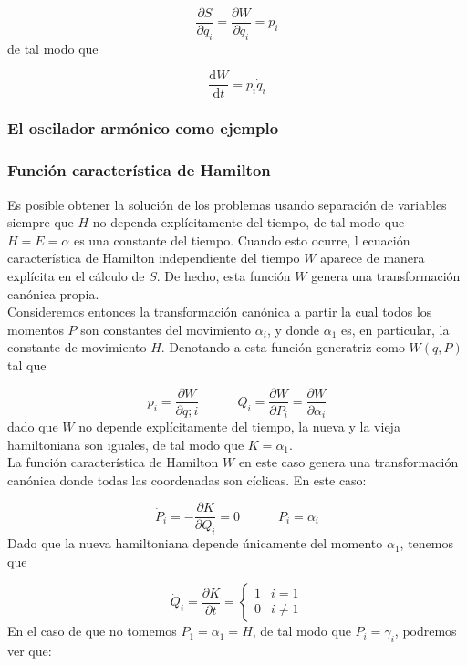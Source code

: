 \documentclass[12pt,a4paper]{article}
\numberwithin{equation}{section}
\numberwithin{figure}{section}
\newcommand{\parciales}[2]{\frac{\partial #1}{\partial #2}}
\newcommand{\D}{\mathrm{d}}
\newcommand{\derivadas}[2]{\frac{\D #1}{\D #2}}
\newcommand{\tquad}{\quad \quad \quad}
\begin{document}
\begin{equation}
\parciales{S}{q_i} = \parciales{W}{q_i} = p_i
\end{equation}
de tal modo que 

\begin{equation}
\derivadas{W}{t} = p_i \dot{q}_i
\end{equation}

\subsubsection{El oscilador armónico como ejemplo}


\subsubsection{Función característica de Hamilton}

Es posible obtener la solución de los problemas usando separación de variables siempre que $H$ no dependa explícitamente del tiempo, de tal modo que $H=E=\alpha$ es una constante del tiempo. Cuando esto ocurre, l ecuación característica de Hamilton independiente del tiempo $W$ aparece de manera explícita en el cálculo de $S$. De hecho, esta función $W$ genera una transformación canónica propia. \\

Consideremos entonces la transformación canónica a partir la cual todos los momentos $P$ son constantes del movimiento $\alpha_i$, y donde $\alpha_1$ es, en particular, la constante de movimiento $H$. Denotando a esta función generatriz como $W(q,P)$ tal que

\begin{equation}
p_i = \parciales{W}{q;i} \tquad Q_i = \parciales{W}{P_i}=\parciales{W}{\alpha_i}
\end{equation}
dado que $W$ no depende explícitamente del tiempo, la nueva y la vieja hamiltoniana son iguales, de tal modo que $K=\alpha_1$. \\

La función característica de Hamilton $W$ en este caso genera una transformación canónica donde todas las coordenadas son cíclicas. En este caso: 

\begin{equation}
\dot{P}_i = - \parciales{K}{Q_i} = 0 \tquad P_i = \alpha_i
\end{equation}
Dado que la nueva hamiltoniana depende únicamente del momento $\alpha_1$, tenemos que

\begin{equation}
\dot{Q}_i = \parciales{K}{t} = \left\lbrace \begin{array}{ll}
1 & i=1\\
0 & i \neq 1 
\end{array} \right.
\end{equation}
En el caso de que no tomemos $P_1=\alpha_1=H$, de tal modo que $P_i = \gamma_i$, podremos ver que:
\end{document}

